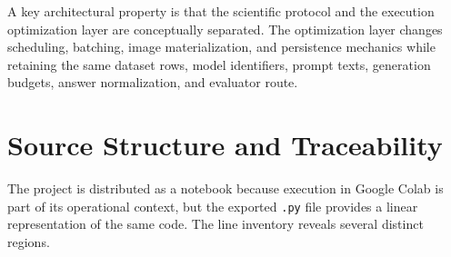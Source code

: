 \documentclass[11pt,a4paper]{article}
\newcommand{\code}[1]{\texttt{#1}}
\begin{document}
A key architectural property is that the scientific protocol and the execution optimization layer are conceptually separated. The optimization layer changes scheduling, batching, image materialization, and persistence mechanics while retaining the same dataset rows, model identifiers, prompt texts, generation budgets, answer normalization, and evaluator route.

\section{Source Structure and Traceability}
The project is distributed as a notebook because execution in Google Colab is part of its operational context, but the exported \code{.py} file provides a linear representation of the same code. The line inventory reveals several distinct regions.
\end{document}

